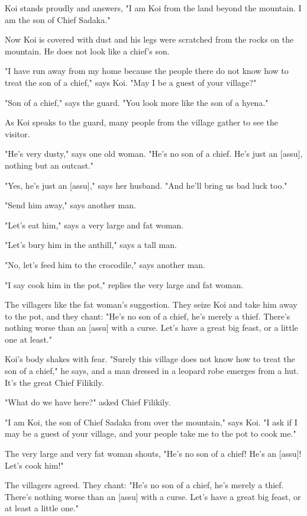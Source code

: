 Koi stands proudly and answers, "I am Koi from the land beyond the mountain. I am the son of Chief Sadaka."

Now Koi is covered with dust and his legs were scratched from the rocks on the mountain. He does not look like a chief's son.

"I have run away from my home because the people there do not know how to treat the son of a chief," says Koi. "May I be a guest of your village?"

"Son of a chief," says the guard. "You look more like the son of a hyena."

As Koi speaks to the guard, many people from the village gather to see the visitor.

"He's very dusty," says one old woman. "He's no son of a chief. He's just an [assu], nothing but an outcast."

"Yes, he's just an [assu]," says her husband. "And he'll bring us bad luck too."

"Send him away," says another man.

"Let's eat him," says a very large and fat woman.

"Let's bury him in the anthill," says a tall man.

"No, let's feed him to the crocodile," says another man.

"I say cook him in the pot," replies the very large and fat woman.

The villagers like the fat woman's suggestion. They seize Koi and take him away to the pot, and they chant: "He's no son of a chief, he's merely a thief. There's nothing worse than an [assu] with a curse. Let's have a great big feast, or a little one at least."

Koi's body shakes with fear. "Surely this village does not know how to treat the son of a chief," he says, and a man dressed in a leopard robe emerges from a hut. It's the great Chief Filikily.

"What do we have here?" asked Chief Filikily.

"I am Koi, the son of Chief Sadaka from over the mountain," says Koi. "I ask if I may be a guest of your village, and your people take me to the pot to cook me."

The very large and very fat woman shouts, "He's no son of a chief! He's an [assu]! Let's cook him!"

The villagers agreed. They chant: "He's no son of a chief, he's merely a thief. There's nothing worse than an [assu] with a curse. Let's have a great big feast, or at least a little one."

